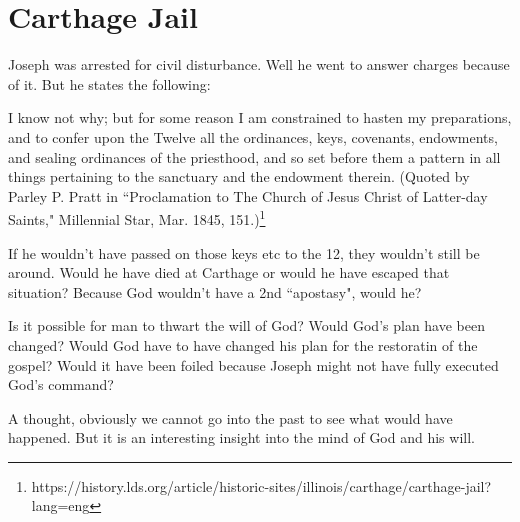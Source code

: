 \chapter{Carthage Jail}

Joseph was arrested for civil disturbance. Well he went to answer charges
because of it. But he states the following:

\begin{displayquote}
I know not why; but for some reason I am constrained to hasten my  preparations, 
and to confer upon the Twelve all the ordinances, keys,  covenants, endowments, 
and sealing ordinances of the priesthood, and so  set before them a pattern in 
all things pertaining to the sanctuary and  the endowment therein. (Quoted by 
Parley P. Pratt in ``Proclamation to  The Church of Jesus Christ of Latter-day 
Saints," Millennial Star, Mar. 1845, 151.)\footnote{
https://history.lds.org/article/historic-sites/illinois/carthage/carthage-jail?lang=eng
}
\end{displayquote}

If he wouldn't have passed on those keys etc to the 12, they wouldn't still be 
around. Would he have died at Carthage or would he have escaped that situation? 
Because God wouldn't have a 2nd ``apostasy", would he?

Is it possible for man to thwart the will of God? Would God's plan have been changed?
Would God have to have changed his plan for the restoratin of the gospel? Would it
have been foiled because Joseph might not have fully executed God's command?

A thought, obviously we cannot go into the past to see what would have happened. But
it is an interesting insight into the mind of God and his will.